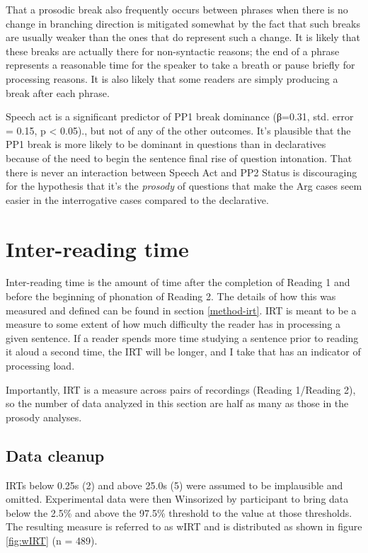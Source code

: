 \documentclass[12pt,oneside]{book}
\begin{document}
That a prosodic break also frequently occurs between phrases when there is no change in branching direction is mitigated somewhat by the fact that such breaks are usually weaker than the ones that do represent such a change. It is likely that these breaks are actually there for non-syntactic reasons; the end of a phrase represents a reasonable time for the speaker to take a breath or pause briefly for processing reasons. It is also likely that some readers are simply producing a break after each phrase.

Speech act is a significant predictor of PP1 break dominance (β=0.31, std. error = 0.15, p \textless{} 0.05)., but not of any of the other outcomes. It's plausible that the PP1 break is more likely to be dominant in questions than in declaratives because of the need to begin the sentence final rise of question intonation. That there is never an interaction between Speech Act and PP2 Status is discouraging for the hypothesis that it's the \emph{prosody} of questions that make the Arg cases seem easier in the interrogative cases compared to the declarative.

\hypertarget{irt}{%
\section{Inter-reading time}\label{irt}}

Inter-reading time is the amount of time after the completion of Reading 1 and before the beginning of phonation of Reading 2. The details of how this was measured and defined can be found in section \ref{method-irt}. IRT is meant to be a measure to some extent of how much difficulty the reader has in processing a given sentence. If a reader spends more time studying a sentence prior to reading it aloud a second time, the IRT will be longer, and I take that has an indicator of processing load.

Importantly, IRT is a measure across pairs of recordings (Reading 1/Reading 2), so the number of data analyzed in this section are half as many as those in the prosody analyses.

\hypertarget{irtDis}{%
\subsection{Data cleanup}\label{irtDis}}

IRTs below 0.25s (2) and above 25.0s (5) were assumed to be implausible and omitted. Experimental data were then Winsorized by participant to bring data below the 2.5\% and above the 97.5\% threshold to the value at those thresholds. The resulting measure is referred to as wIRT and is distributed as shown in figure \ref{fig:wIRT} (n = 489).
\end{document}

